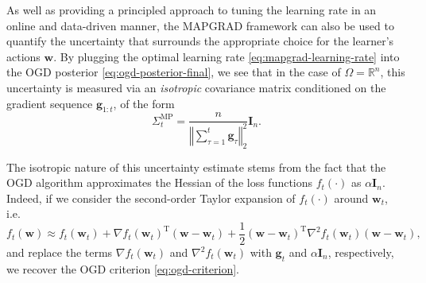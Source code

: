 \begin{mccorrection}
As well as providing a principled approach to tuning the learning rate in an online and data-driven manner, the MAPGRAD framework can also be used to quantify the uncertainty that surrounds the appropriate choice for the learner's actions $\mathbf{w}$.
By plugging the optimal learning rate \eqref{eq:mapgrad-learning-rate} into the OGD posterior \eqref{eq:ogd-posterior-final}, we see that in the case of $\Omega = \mathbb{R}^n$, this uncertainty is measured via an \emph{isotropic} covariance matrix conditioned on the gradient sequence $\mathbf{g}_{1:t}$, of the form
\begin{equation}
\label{eq:mapgrad-uncertainty-estimate}
	\Sigma_t^\text{MP} = \frac{n}{\left\Vert\sum_{\tau=1}^t\mathbf{g}_\tau\right\Vert_2^2}\mathbf{I}_n.
\end{equation}
\end{mccorrection}
The isotropic nature of this uncertainty estimate stems from the fact that the OGD algorithm approximates the Hessian of the loss functions $f_t(\cdot)$ as $\alpha\mathbf{I}_n$. Indeed, if we consider the second-order Taylor expansion of $f_t(\cdot)$ around $\mathbf{w}_t$, i.e.\
\begin{equation}
	f_t(\mathbf{w})
	\approx f_t(\mathbf{w}_t) + \nabla f_t(\mathbf{w}_t)^\text{T}(\mathbf{w} - \mathbf{w}_t) + \frac{1}{2}(\mathbf{w} - \mathbf{w}_t)^\text{T}\nabla^2 f_t(\mathbf{w}_t)(\mathbf{w} - \mathbf{w}_t),
\end{equation}
and replace the terms $\nabla f_t(\mathbf{w}_t)$ and $\nabla^2 f_t(\mathbf{w}_t)$ with $\mathbf{g}_t$ and $\alpha\mathbf{I}_n$, respectively, we recover the OGD criterion \eqref{eq:ogd-criterion}.

